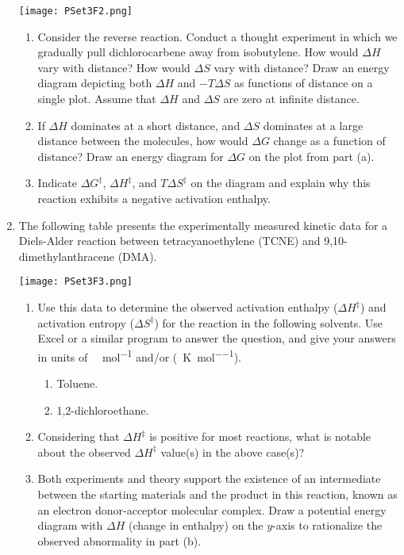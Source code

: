 \documentclass[../psets.tex]{subfiles}
\begin{document}
\begin{enumerate}
    \begin{center}
        \texttt{[image: PSet3F2.png]}
    \end{center}
    \begin{enumerate}
        \item Consider the reverse reaction. Conduct a thought experiment in which we gradually pull dichlorocarbene away from isobutylene. How would $\Delta H$ vary with distance? How would $\Delta S$ vary with distance? Draw an energy diagram depicting both $\Delta H$ and $-T\Delta S$ as functions of distance on a single plot. Assume that $\Delta H$ and $\Delta S$ are zero at infinite distance.
        \item If $\Delta H$ dominates at a short distance, and $\Delta S$ dominates at a large distance between the molecules, how would $\Delta G$ change as a function of distance? Draw an energy diagram for $\Delta G$ on the plot from part (a).
        \item Indicate $\Delta G^\ddagger$, $\Delta H^\ddagger$, and $T\Delta S^\ddagger$ on the diagram and explain why this reaction exhibits a negative activation enthalpy.
    \end{enumerate}
    \pagebreak
    \item The following table presents the experimentally measured kinetic data for a Diels-Alder reaction between tetracyanoethylene (TCNE) and 9,10-dimethylanthracene (DMA).
    \begin{center}
        \texttt{[image: PSet3F3.png]}
    \end{center}
    \begin{enumerate}
        \item Use this data to determine the observed activation enthalpy ($\Delta H^\ddagger$) and activation entropy ($\Delta S^\ddagger$) for the reaction in the following solvents. Use Excel or a similar program to answer the question, and give your answers in units of \si{\kilo\calorie\per\mole} and/or \si{\entropyunit} (\si{\calorie\per\kelvin\per\mole}).
        \begin{enumerate}
            \item Toluene.
            \item 1,2-dichloroethane.
        \end{enumerate}
        \item Considering that $\Delta H^\ddagger$ is positive for most reactions, what is notable about the observed $\Delta H^\ddagger$ value(s) in the above case(s)?
        \item Both experiments and theory support the existence of an intermediate between the starting materials and the product in this reaction, known as an electron donor-acceptor molecular complex. Draw a potential energy diagram with $\Delta H$ (change in enthalpy) on the $y$-axis to rationalize the observed abnormality in part (b).

\end{enumerate}
\end{enumerate}
\end{document}
